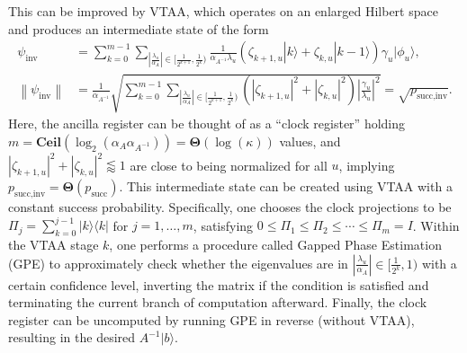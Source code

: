 \documentclass[letterpaper,onecolumn,11pt,accepted=2026-02-14]{quantumarticle}
\newcommand{\abs}[1]{\left\lvert#1\right\rvert}
\newcommand{\norm}[1]{\left\lVert#1\right\rVert}
\theoremstyle{remark}
\theoremstyle{plain}
\newcommand{\ket}[1]{|#1\rangle}
\newcommand{\bra}[1]{\langle#1|}
\newcommand{\ketbra}[2]{\ket{#1}\!\bra{#2}}
\begin{document}
This can be improved by VTAA, which operates on an enlarged Hilbert space and produces an intermediate state of the form~\cite{Childs2015LinearSystems}
\begin{equation}
\begin{aligned}
    \psi_{\text{inv}}&=
    \sum_{k=0}^{m-1}\sum_{\abs{\frac{\lambda_u}{\alpha_A}}\in\big[\frac{1}{2^{k+1}},\frac{1}{2^k}\big)}
    \frac{1}{\alpha_{A^{-1}}\lambda_u}
    \left(\zeta_{k+1,u}\ket{k}+\zeta_{k,u}\ket{k-1}\right)\gamma_u\ket{\phi_u},\\
    \norm{\psi_{\text{inv}}}&=\frac{1}{\alpha_{A^{-1}}}\sqrt{\sum_{k=0}^{m-1}\sum_{\abs{\frac{\lambda_u}{\alpha_A}}\in\big[\frac{1}{2^{k+1}},\frac{1}{2^k}\big)}
    \left(\abs{\zeta_{k+1,u}}^2+\abs{\zeta_{k,u}}^2\right)
    \abs{\frac{\gamma_u}{\lambda_{u}}}^2}
    =\sqrt{p_{\text{succ,inv}}}.
\end{aligned}
\end{equation}
Here, the ancilla register can be thought of as a ``clock register'' holding $m=\mathbf{Ceil}\left(\log_2\left(\alpha_A\alpha_{A^{-1}}\right)\right)=\mathbf{\Theta}(\log(\kappa))$ values, and $\abs{\zeta_{k+1,u}}^2+\abs{\zeta_{k,u}}^2\lessapprox1$ are close to being normalized for all $u$, implying $p_{\text{succ,inv}}=\mathbf{\Theta}(p_{\text{succ}})$. This intermediate state can be created using VTAA with a constant success probability. Specifically, one chooses the clock projections to be $\Pi_j=\sum_{k=0}^{j-1}\ketbra{k}{k}$ for $j=1,\ldots,m$, 
satisfying
$0\leq\Pi_1\leq\Pi_2\leq\cdots\leq\Pi_m=I$. 
Within the VTAA stage $k$, one performs a procedure called Gapped Phase Estimation (GPE) to approximately check whether the eigenvalues are in $\abs{\frac{\lambda_u}{\alpha_A}}\in\big[\frac{1}{2^{k}},1\big)$ with a certain confidence level, inverting the matrix if the condition is satisfied and terminating the current branch of computation afterward. Finally, the clock register can be uncomputed by running GPE in reverse (without VTAA), resulting in the desired $A^{-1}\ket{b}$.
\end{document}
